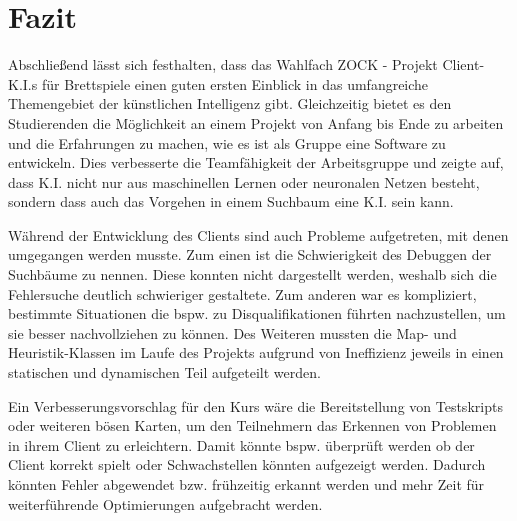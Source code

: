 \documentclass[12pt,a4paper,bibliography=totocnumbered,listof=totocnumbered]{article}
\begin{document}
\section{Fazit}
Abschließend lässt sich festhalten, dass das Wahlfach \glqq ZOCK - Projekt Client-K.I.s für Brettspiele\grqq{} einen guten ersten Einblick in das umfangreiche Themengebiet der künstlichen Intelligenz gibt. Gleichzeitig bietet es den Studierenden die Möglichkeit an einem Projekt von Anfang bis Ende zu arbeiten und die Erfahrungen zu machen, wie es ist als Gruppe eine Software zu entwickeln. Dies verbesserte die Teamfähigkeit der Arbeitsgruppe und zeigte auf, dass K.I. nicht nur aus maschinellen Lernen oder neuronalen Netzen besteht, sondern dass auch das Vorgehen in einem Suchbaum eine K.I. sein kann.

Während der Entwicklung des Clients sind auch Probleme aufgetreten, mit denen umgegangen werden musste. Zum einen ist die Schwierigkeit des Debuggen der Suchbäume zu nennen. Diese konnten nicht dargestellt werden, weshalb sich die Fehlersuche deutlich schwieriger gestaltete. Zum anderen war es kompliziert, bestimmte Situationen die bspw. zu Disqualifikationen führten nachzustellen, um sie besser nachvollziehen zu können. Des Weiteren mussten die Map- und Heuristik-Klassen im Laufe des Projekts aufgrund von Ineffizienz jeweils in einen statischen und dynamischen Teil aufgeteilt werden.

Ein Verbesserungsvorschlag für den Kurs wäre die Bereitstellung von Testskripts oder weiteren \glqq bösen\grqq{} Karten, um den Teilnehmern das Erkennen von Problemen in ihrem Client zu erleichtern. Damit könnte bspw. überprüft werden ob der Client korrekt spielt oder Schwachstellen könnten aufgezeigt werden. Dadurch könnten Fehler abgewendet bzw. frühzeitig erkannt werden und mehr Zeit für weiterführende Optimierungen aufgebracht werden.

\newpage
\renewcommand\refname{Quellenverzeichnis}


\pagebreak
\end{document}
